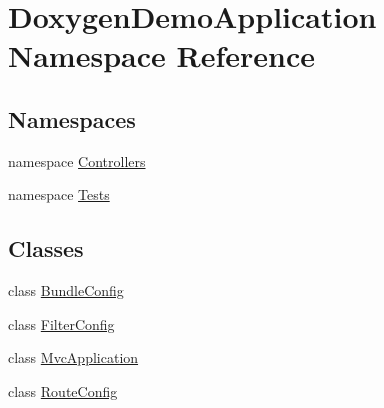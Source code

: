 \hypertarget{namespace_doxygen_demo_application}{}\section{Doxygen\+Demo\+Application Namespace Reference}
\label{namespace_doxygen_demo_application}
\subsection*{Namespaces}
\begin{DoxyCompactItemize}
\item 
namespace \mbox{\hyperlink{namespace_doxygen_demo_application_1_1_controllers}{Controllers}}
\item 
namespace \mbox{\hyperlink{namespace_doxygen_demo_application_1_1_tests}{Tests}}
\end{DoxyCompactItemize}
\subsection*{Classes}
\begin{DoxyCompactItemize}
\item 
class \mbox{\hyperlink{class_doxygen_demo_application_1_1_bundle_config}{Bundle\+Config}}
\item 
class \mbox{\hyperlink{class_doxygen_demo_application_1_1_filter_config}{Filter\+Config}}
\item 
class \mbox{\hyperlink{class_doxygen_demo_application_1_1_mvc_application}{Mvc\+Application}}
\item 
class \mbox{\hyperlink{class_doxygen_demo_application_1_1_route_config}{Route\+Config}}
\end{DoxyCompactItemize}
